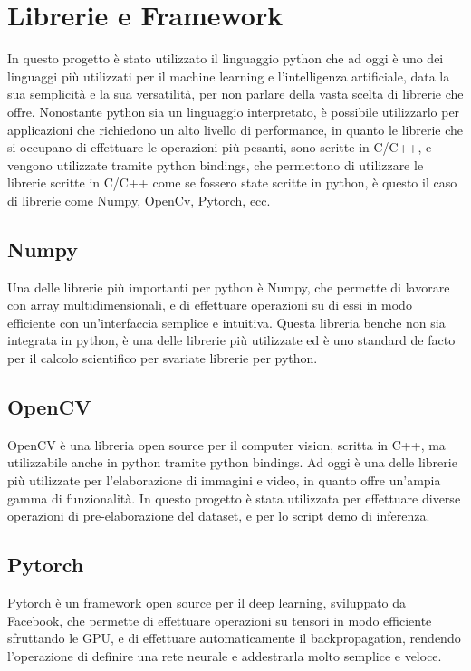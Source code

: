 \section{Librerie e Framework\ok}

In questo progetto è stato utilizzato il linguaggio python che ad oggi è uno dei linguaggi più utilizzati per il machine learning e l'intelligenza artificiale,
data la sua semplicità e la sua versatilità, per non parlare della vasta scelta di librerie che offre.
Nonostante python sia un linguaggio interpretato, è possibile utilizzarlo per applicazioni che richiedono un alto livello di performance,
in quanto le librerie che si occupano di effettuare le operazioni più pesanti, sono scritte in C/C++, e vengono 
utilizzate tramite python bindings, che permettono di utilizzare le librerie scritte in C/C++ come se fossero state scritte in python,
è questo il caso di librerie come Numpy, OpenCv, Pytorch, ecc.

\subsection{Numpy\ok}
Una delle librerie più importanti per python è Numpy, che permette di lavorare con array multidimensionali, e di effettuare operazioni su di essi 
in modo efficiente con un'interfaccia semplice e intuitiva. Questa libreria benche non sia integrata in python, è una delle librerie più utilizzate
ed è uno standard de facto per il calcolo scientifico per svariate librerie per python.

\subsection{OpenCV\ok}
OpenCV è una libreria open source per il computer vision, scritta in C++, ma utilizzabile anche in python tramite python bindings.
Ad oggi è una delle librerie più utilizzate per l'elaborazione di immagini e video, in quanto offre un'ampia gamma di funzionalità.
In questo progetto è stata utilizzata per effettuare diverse operazioni di pre-elaborazione del dataset, e per lo script demo di inferenza.

\subsection{Pytorch\ok}
Pytorch è un framework open source per il deep learning, sviluppato da Facebook, che permette di effettuare operazioni su tensori in modo efficiente
sfruttando le GPU, e di effettuare automaticamente il backpropagation, rendendo l'operazione di definire una rete neurale e addestrarla
molto semplice e veloce.

